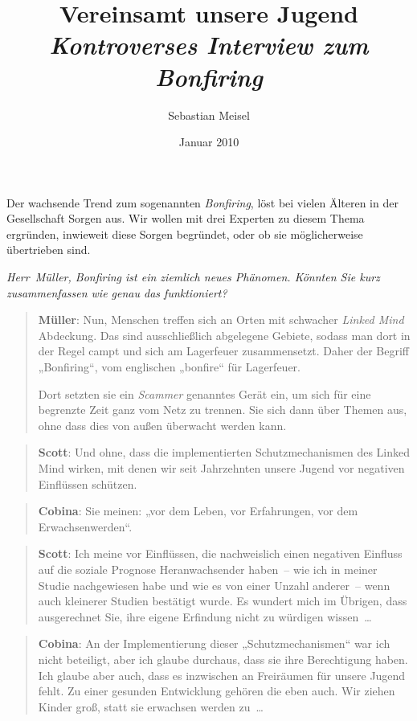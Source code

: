\documentclass{scrartcl}
\author{Sebastian Meisel}
\date{Januar 2010}
\title{Vereinsamt unsere Jugend\\
\emph{Kontroverses Interview zum Bonfiring} \\}
\newenvironment{frage}{\itshape}{}
\newenvironment{antworta}{
  \begin{quotation}
  }{
  \end{quotation}
}
\newenvironment{antwortb}{
  \begin{quotation}
  }{
  \end{quotation}
}
\newcommand{\name}[1]{\textbf{#1}}
\begin{document}
\maketitle


{Der wachsende Trend zum sogenannten \emph{Bonfiring}, löst bei
vielen Älteren in der Gesellschaft Sorgen aus. Wir wollen
mit drei Experten zu diesem Thema ergründen, inwieweit diese
Sorgen begründet, oder ob sie möglicherweise übertrieben sind.\\}

\begin{frage}
Herr~Müller, Bonfiring ist ein ziemlich neues
Phänomen. Könnten Sie kurz zusammenfassen wie genau das
funktioniert?
\end{frage}


\begin{antworta}
\name{Müller}: Nun, Menschen treffen sich an Orten mit schwacher
\emph{Linked Mind} Abdeckung. Das sind ausschließlich
abgelegene Gebiete, sodass man dort in der Regel campt
und sich am Lagerfeuer zusammensetzt. Daher der Begriff
„Bonfiring“, vom englischen „bonfire“ für Lagerfeuer.

Dort setzten sie ein \emph{Scammer} genanntes Gerät ein, um sich
für eine begrenzte Zeit ganz vom Netz zu trennen. Sie sich
dann über Themen aus, ohne dass dies von außen überwacht
werden kann.
\end{antworta}


\begin{antwortb}
\name{Scott}: Und ohne, dass die implementierten Schutzmechanismen
des Linked Mind wirken, mit denen wir seit Jahrzehnten
unsere Jugend vor negativen Einflüssen schützen.
\end{antwortb}


\begin{antworta}
\name{Cobina}: Sie meinen: „vor dem Leben, vor Erfahrungen,
vor dem Erwachsenwerden“.
\end{antworta}


\begin{antwortb}
\name{Scott}: Ich meine vor Einflüssen, die nachweislich einen
negativen Einfluss auf die soziale Prognose
Heranwachsender haben~– wie ich in meiner Studie
nachgewiesen habe und wie es von einer Unzahl anderer~–
wenn auch kleinerer Studien bestätigt wurde. Es wundert
mich im Übrigen, dass ausgerechnet Sie, ihre eigene
Erfindung nicht zu würdigen wissen~…
\end{antwortb}


\begin{antworta}
\name{Cobina}: An der Implementierung dieser
„Schutzmechanismen“ war ich nicht beteiligt, aber ich
glaube durchaus, dass sie ihre Berechtigung haben. Ich
glaube aber auch, dass es inzwischen an Freiräumen für
unsere Jugend fehlt. Zu einer gesunden Entwicklung
gehören die eben auch. Wir ziehen Kinder groß, statt sie
erwachsen werden zu~…
\end{antworta}
\end{document}

